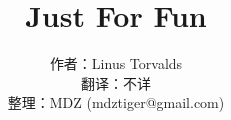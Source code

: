 \documentclass[10pt,a4paper]{book}
\title{\Huge Just For Fun}
\author{作者：Linus Torvalds\\
翻译：不详\\
整理：MDZ (mdztiger@gmail.com)}
\begin{document}
\maketitle
\newpage



\newpage
\tableofcontents
\setlength{\baselineskip}{13pt} %
\renewcommand{\arraystretch}{1.5}



\newpage


\newpage


\newpage


\newpage


\end{document}
